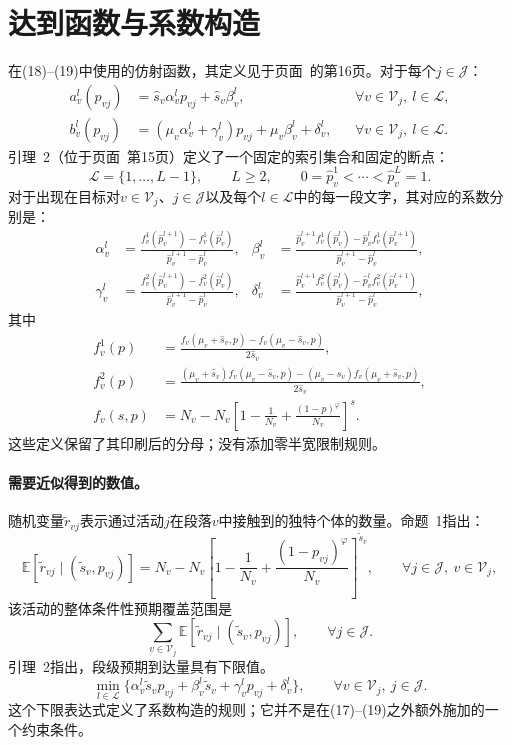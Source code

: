 \documentclass{article}
\begin{document}
\section*{达到函数与系数构造}
在(18)--(19)中使用的仿射函数，其定义见于页面~的第16页。对于每个$j\in\mathcal J$：
\begin{align*}
a^l_v(p_{vj})&=\hat s_v\alpha^l_vp_{vj}+\hat s_v\beta^l_v,
&&\forall v\in\mathcal V_j,\ l\in\mathcal L,\\
b^l_v(p_{vj})&=(\mu_v\alpha^l_v+\gamma^l_v)p_{vj}+\mu_v\beta^l_v+\delta^l_v,
&&\forall v\in\mathcal V_j,\ l\in\mathcal L.
\end{align*}
引理~2（位于页面~第15页）定义了一个固定的索引集合和固定的断点：
\[
\mathcal L=\{1,\ldots,L-1\},\qquad L\geq2,\qquad
0=\hat p^1_v<\cdots<\hat p^L_v=1.
\]
对于出现在目标对$v\in\mathcal V_j$、$j\in\mathcal J$以及每个$l\in\mathcal L$中的每一段文字，其对应的系数分别是：
\begin{align*}
\alpha^l_v&=\frac{f^1_v(\hat p^{l+1}_v)-f^1_v(\hat p^l_v)}{\hat p^{l+1}_v-\hat p^l_v},&
\beta^l_v&=\frac{\hat p^{l+1}_vf^1_v(\hat p^l_v)-\hat p^l_vf^1_v(\hat p^{l+1}_v)}{\hat p^{l+1}_v-\hat p^l_v},\\
\gamma^l_v&=\frac{f^2_v(\hat p^{l+1}_v)-f^2_v(\hat p^l_v)}{\hat p^{l+1}_v-\hat p^l_v},&
\delta^l_v&=\frac{\hat p^{l+1}_vf^2_v(\hat p^l_v)-\hat p^l_vf^2_v(\hat p^{l+1}_v)}{\hat p^{l+1}_v-\hat p^l_v},
\end{align*}
其中
\begin{align*}
f^1_v(p)&=\frac{f_v(\mu_v+\hat s_v,p)-f_v(\mu_v-\hat s_v,p)}{2\hat s_v},\\
f^2_v(p)&=\frac{(\mu_v+\hat s_v)f_v(\mu_v-\hat s_v,p)-(\mu_v-\hat s_v)f_v(\mu_v+\hat s_v,p)}{2\hat s_v},\\
f_v(s,p)&=N_v-N_v\left[1-\frac1{N_v}+\frac{(1-p)^\varphi}{N_v}\right]^s.
\end{align*}
这些定义保留了其印刷后的分母；没有添加零半宽限制规则。

\paragraph{需要近似得到的数值。}
随机变量$\tilde r_{vj}$表示通过活动$j$在段落$v$中接触到的独特个体的数量。命题~1指出：
\[
\mathbb E[\tilde r_{vj}\mid(\tilde s_v,p_{vj})]
=N_v-N_v\left[1-\frac1{N_v}+\frac{(1-p_{vj})^\varphi}{N_v}\right]^{\tilde s_v},
\qquad\forall j\in\mathcal J,\ v\in\mathcal V_j,
\]
该活动的整体条件性预期覆盖范围是
\[
\sum_{v\in\mathcal V_j}\mathbb E[\tilde r_{vj}\mid(\tilde s_v,p_{vj})],\qquad\forall j\in\mathcal J.
\]
引理~2指出，段级预期到达量具有下限值。
\[
\min_{l\in\mathcal L}\{\alpha^l_v\tilde s_vp_{vj}+\beta^l_v\tilde s_v+\gamma^l_vp_{vj}+\delta^l_v\},
\qquad\forall v\in\mathcal V_j,\ j\in\mathcal J.
\]
这个下限表达式定义了系数构造的规则；它并不是在(17)--(19)之外额外施加的一个约束条件。
\end{document}
